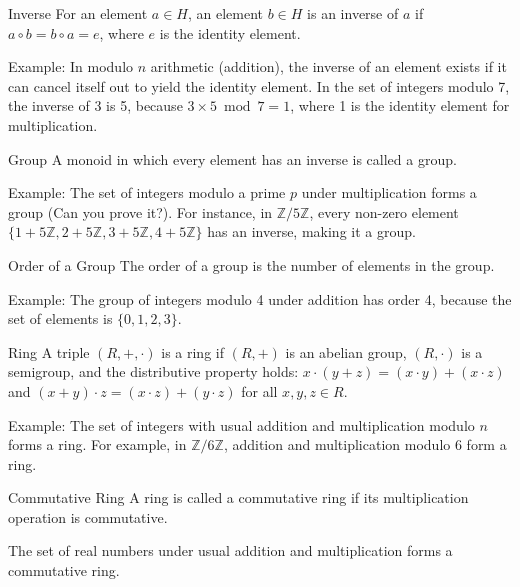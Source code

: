 \documentclass{article}
\begin{document}
\begin{definition}{Inverse}{}
For an element $a \in H$, an element $b \in H$ is an inverse of $a$ if $a \circ b = b \circ a = e$, where $e$ is the identity element.
\end{definition}

Example: In modulo $n$ arithmetic (addition), the inverse of an element exists if it can cancel itself out to yield the identity element. In the set of integers modulo 7, the inverse of 3 is 5, because $3 \times 5 \bmod 7 = 1$, where 1 is the identity element for multiplication.

\begin{definition}{Group}{}
A monoid in which every element has an inverse is called a group.
\end{definition}

Example: The set of integers modulo a prime $p$ under multiplication forms a group (Can you prove it?). For instance, in $\mathbb{Z}/5\mathbb{Z}$, every non-zero element $\{1 + 5\mathbb{Z}, 2 + 5\mathbb{Z}, 3 + 5\mathbb{Z}, 4 + 5\mathbb{Z}\}$ has an inverse, making it a group.

\begin{definition}{Order of a Group}{}
The order of a group is the number of elements in the group.
\end{definition}

Example: The group of integers modulo 4 under addition has order 4, because the set of elements is $\{0, 1, 2, 3\}$.

\begin{definition}{Ring}{}
A triple $(R, +, \cdot)$ is a ring if $(R, +)$ is an abelian group, $(R, \cdot)$ is a semigroup, and the distributive property holds: $x \cdot (y + z) = (x \cdot y) + (x \cdot z)$ and $(x + y) \cdot z = (x \cdot z) + (y \cdot z)$ for all $x, y, z \in R$.
\end{definition}

Example: The set of integers with usual addition and multiplication modulo $n$ forms a ring. For example, in $\mathbb{Z}/6\mathbb{Z}$, addition and multiplication modulo 6 form a ring.

\begin{definition}{Commutative Ring}{}
A ring is called a commutative ring if its multiplication operation is commutative.
\end{definition}

The set of real numbers under usual addition and multiplication forms a commutative ring.
\end{document}

